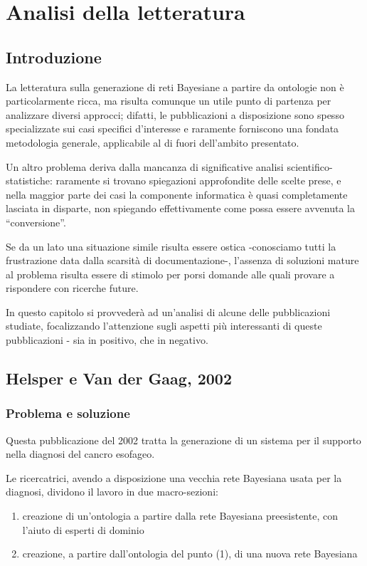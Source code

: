 \chapter{Analisi della letteratura}

\section{Introduzione}
La letteratura sulla generazione di reti Bayesiane a partire da ontologie non è particolarmente ricca, ma risulta comunque un utile punto di partenza per analizzare diversi approcci; difatti, le pubblicazioni a disposizione sono spesso specializzate sui casi specifici d'interesse e raramente forniscono una fondata metodologia generale, applicabile al di fuori dell'ambito presentato.

Un altro problema deriva dalla mancanza di significative analisi scientifico-statistiche: raramente si trovano spiegazioni approfondite delle scelte prese, e nella maggior parte dei casi la componente informatica è quasi completamente lasciata in disparte, non spiegando effettivamente come possa essere avvenuta la ``conversione''.

Se da un lato una situazione simile risulta essere ostica -conosciamo tutti la frustrazione data dalla scarsità di documentazione-, l'assenza di soluzioni mature al problema risulta essere di stimolo per porsi domande alle quali provare a rispondere con ricerche future.

In questo capitolo si provvederà ad un'analisi di alcune delle pubblicazioni studiate, focalizzando l'attenzione sugli aspetti più interessanti di queste pubblicazioni - sia in positivo, che in negativo.


\section{Helsper e Van der Gaag, 2002}
\subsection{Problema e soluzione}
Questa pubblicazione del 2002\cite{helsper2002} tratta la generazione di un sistema per il supporto nella diagnosi del cancro esofageo.

Le ricercatrici, avendo a disposizione una vecchia rete Bayesiana usata per la diagnosi, dividono il lavoro in due macro-sezioni:
\begin{enumerate}
	\item creazione di un'ontologia a partire dalla rete Bayesiana preesistente, con l'aiuto di esperti di dominio
	\item creazione, a partire dall'ontologia del punto (1), di una nuova rete Bayesiana
\end{enumerate}

